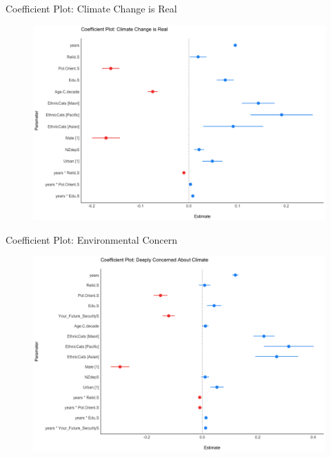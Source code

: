 \documentclass{beamer}
\begin{document}
\begin{frame}{Coefficient Plot: Climate Change is Real}
\begin{figure}
\includegraphics[width=.99\textwidth,height=\textheight,keepaspectratio]{Figures/mREAL.png}
\end{figure}
\end{frame}

\begin{frame}{Coefficient Plot: Environmental Concern}
\begin{figure}
\includegraphics[width=.99\textwidth,height=\textheight,keepaspectratio]{Figures/mCONCERN.png}
\end{figure}
\end{frame}
\end{document}
